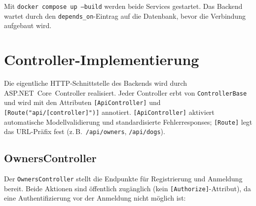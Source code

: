 Mit \texttt{docker compose up --build} werden beide Services gestartet. Das Backend
wartet durch den \texttt{depends\_on}-Eintrag auf die Datenbank, bevor die
Verbindung aufgebaut wird.

\section{Controller-Implementierung}
\label{sec:controller}

Die eigentliche HTTP-Schnittstelle des Backends wird durch ASP.NET~Core~Controller realisiert.
Jeder Controller erbt von \texttt{ControllerBase} und wird mit den Attributen
\texttt{[ApiController]} und \texttt{[Route("api/[controller]")]} annotiert.
\texttt{[ApiController]} aktiviert automatische Modellvalidierung und standardisierte
Fehlerresponses; \texttt{[Route]} legt das URL-Präfix fest (z.\,B.\ \texttt{/api/owners},
\texttt{/api/dogs}).

\subsection{OwnersController}
\label{subsec:owners-controller}

Der \texttt{OwnersController} stellt die Endpunkte für Registrierung und Anmeldung bereit.
Beide Aktionen sind öffentlich zugänglich (kein \texttt{[Authorize]}-Attribut), da eine
Authentifizierung vor der Anmeldung nicht möglich ist:

